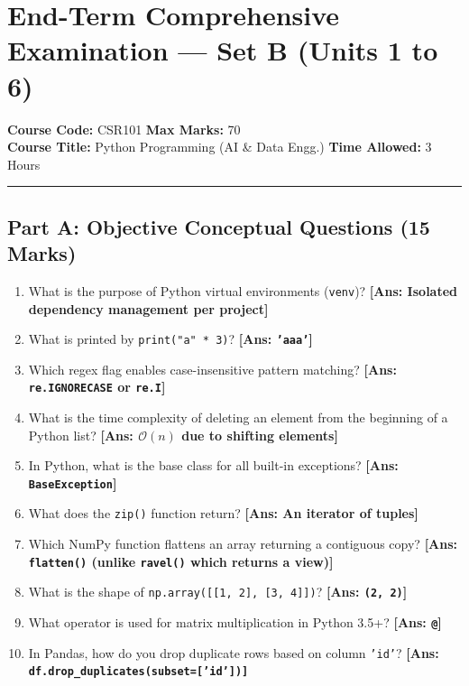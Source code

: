 \section{End-Term Comprehensive Examination --- Set B (Units 1 to 6)}
\noindent\textbf{Course Code:} CSR101 \hfill \textbf{Max Marks:} 70\\
\textbf{Course Title:} Python Programming (AI \& Data Engg.) \hfill \textbf{Time Allowed:} 3 Hours\\
\vspace{4mm}
\hrule
\vspace{4mm}

\subsection*{Part A: Objective Conceptual Questions (15 Marks)}
\begin{enumerate}[label=\textbf{\arabic*.}]
    \item What is the purpose of Python virtual environments (\texttt{venv})? \hfill \textbf{[Ans: Isolated dependency management per project]}
    \item What is printed by \texttt{print("a" * 3)}? \hfill \textbf{[Ans: \texttt{'aaa'}]}
    \item Which regex flag enables case-insensitive pattern matching? \hfill \textbf{[Ans: \texttt{re.IGNORECASE} or \texttt{re.I}]}
    \item What is the time complexity of deleting an element from the beginning of a Python list? \hfill \textbf{[Ans: $\mathcal{O}(n)$ due to shifting elements]}
    \item In Python, what is the base class for all built-in exceptions? \hfill \textbf{[Ans: \texttt{BaseException}]}
    \item What does the \texttt{zip()} function return? \hfill \textbf{[Ans: An iterator of tuples]}
    \item Which NumPy function flattens an array returning a contiguous copy? \hfill \textbf{[Ans: \texttt{flatten()} (unlike \texttt{ravel()} which returns a view)]}
    \item What is the shape of \texttt{np.array([[1, 2], [3, 4]])}? \hfill \textbf{[Ans: \texttt{(2, 2)}]}
    \item What operator is used for matrix multiplication in Python 3.5+? \hfill \textbf{[Ans: \texttt{@}]}
    \item In Pandas, how do you drop duplicate rows based on column \texttt{'id'}? \hfill \textbf{[Ans: \texttt{df.drop\_duplicates(subset=['id'])]}}

\end{enumerate}
